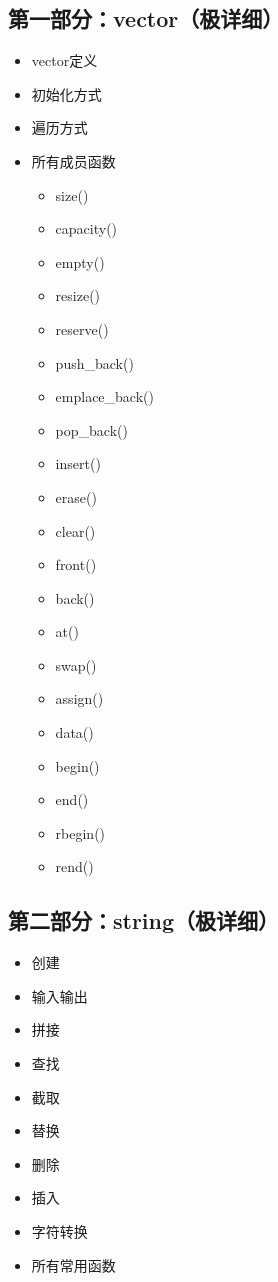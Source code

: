 \documentclass[10pt,twocolumn]{extarticle}
\begin{document}
\subsection*{第一部分：vector（极详细）}
\begin{itemize}
    \item vector定义
    \item 初始化方式
    \item 遍历方式
    \item 所有成员函数
    \begin{itemize}
        \item size()
        \item capacity()
        \item empty()
        \item resize()
        \item reserve()
        \item push\_back()
        \item emplace\_back()
        \item pop\_back()
        \item insert()
        \item erase()
        \item clear()
        \item front()
        \item back()
        \item at()
        \item swap()
        \item assign()
        \item data()
        \item begin()
        \item end()
        \item rbegin()
        \item rend()
    \end{itemize}
\end{itemize}

\subsection*{第二部分：string（极详细）}
\begin{itemize}
    \item 创建
    \item 输入输出
    \item 拼接
    \item 查找
    \item 截取
    \item 替换
    \item 删除
    \item 插入
    \item 字符转换
    \item 所有常用函数
\end{itemize}
\end{document}

